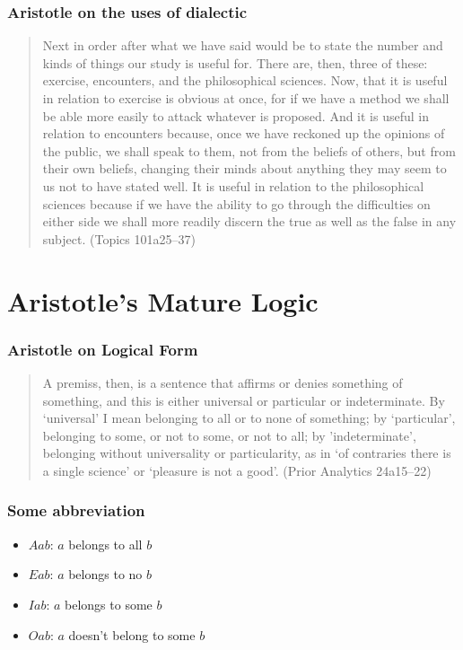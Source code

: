 \documentclass[compress,12pt]{beamer}
\begin{document}
\begin{frame}
      \frametitle{Aristotle on the uses of dialectic}
      \begin{quote}
          Next in order after what we have said would be to state the number and kinds of things our study is useful for. There are, then, three of these: exercise, encounters, and the philosophical sciences. Now, that it is useful in relation to exercise is obvious at once, for if we have a method we shall be able more easily to attack whatever is proposed. And it is useful in relation to encounters because, once we have reckoned up the opinions of the public, we shall speak to them, not from the beliefs of others, but from their own beliefs, changing their minds about anything they may seem to us not to have stated well. It is useful in relation to the philosophical sciences because if we have the ability to go through the difficulties on either side we shall more readily discern the true as well as the false in any subject. (\textup{Topics} 101a25--37)
      \end{quote}
\end{frame}

\section{Aristotle's Mature Logic}

\begin{frame}
    \frametitle{Aristotle on Logical Form}
    \begin{quote}
        A premiss, then, is a sentence that affirms or denies something of something, and this is either universal or particular or indeterminate. By `universal' I mean belonging to all or to none of something; by `particular', belonging to some, or not to some, or not to all; by 'indeterminate', belonging without universality or particularity, as in `of contraries there is a single science' or `pleasure is not a good'. (\textup{Prior Analytics} 24a15--22)
    \end{quote}
    
\end{frame}

\begin{frame}
    \frametitle{Some abbreviation}
    \begin{itemize}
        \item $Aab$: $a$ belongs to all $b$
        \item $Eab$: $a$ belongs to no $b$
        \item $Iab$: $a$ belongs to some $b$
        \item $Oab$: $a$ doesn't belong to some $b$
    \end{itemize}
\end{frame}
\end{document}
